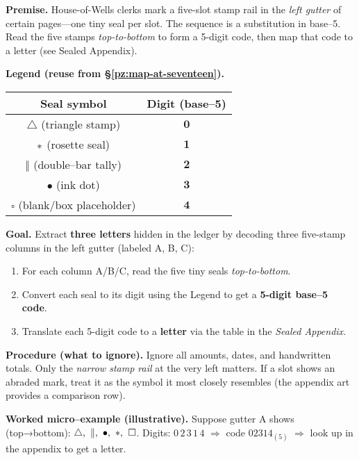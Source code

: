 \documentclass[11pt]{article}
\begin{document}
\begin{itemize}
\medskip
\noindent\textbf{Premise.} House-of-Wells clerks mark a five-slot stamp rail in the \emph{left gutter} of certain pages—one tiny seal per slot. The sequence is a substitution in base–5. Read the five stamps \emph{top-to-bottom} to form a 5-digit code, then map that code to a letter (see Sealed Appendix).

\medskip
\noindent\textbf{Legend (reuse from \S\ref{pz:map-at-seventeen}).}
\begin{center}
\begin{tabular}{c|c}
\textbf{Seal symbol} & \textbf{Digit (base–5)} \\
\hline
\(\triangle\) (triangle stamp) & \(\mathbf{0}\) \\
\(\large\ast\) (rosette seal) & \(\mathbf{1}\) \\
\(\Vert\) (double–bar tally) & \(\mathbf{2}\) \\
\(\bullet\) (ink dot) & \(\mathbf{3}\) \\
\(\square\) (blank/box placeholder) & \(\mathbf{4}\) \\
\end{tabular}
\end{center}

\medskip
\noindent\textbf{Goal.} Extract \textbf{three letters} hidden in the ledger by decoding three five-stamp columns in the left gutter (labeled \textsc{A}, \textsc{B}, \textsc{C}):

\begin{enumerate}\setlength\itemsep{0.25em}
  \item For each column \textsc{A}/\textsc{B}/\textsc{C}, read the five tiny seals \emph{top-to-bottom}.
  \item Convert each seal to its digit using the Legend to get a \textbf{5-digit base–5 code}.
  \item Translate each 5-digit code to a \textbf{letter} via the table in the \emph{Sealed Appendix}.
\end{enumerate}

\medskip
\noindent\textbf{Procedure (what to ignore).} Ignore all amounts, dates, and handwritten totals. Only the \emph{narrow stamp rail} at the very left matters. If a slot shows an abraded mark, treat it as the symbol it most closely resembles (the appendix art provides a comparison row).

\medskip
\noindent\textbf{Worked micro–example (illustrative).}  
Suppose gutter \textsc{A} shows (top→bottom): \(\triangle,\ \Vert,\ \bullet,\ \large\ast,\ \square\).  
Digits: \(0\,2\,3\,1\,4\) \(\Rightarrow\) code \(02314_{(5)}\) \(\Rightarrow\) look up in the appendix to get a letter.


\end{itemize}
\end{document}

